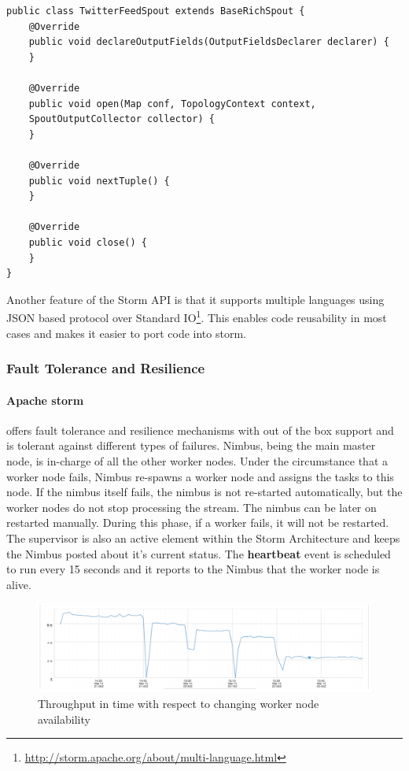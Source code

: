 \documentclass[runningheads,a4paper]{llncs}[2015/06/24]
\begin{document}
\begin{lstlisting}[float,caption=Bare Spout Implementation,label=lst:spout]
public class TwitterFeedSpout extends BaseRichSpout {
	@Override
	public void declareOutputFields(OutputFieldsDeclarer declarer) {
	}
	
	@Override
	public void open(Map conf, TopologyContext context, 
	SpoutOutputCollector collector) {
	}

	@Override
	public void nextTuple() {
	}

	@Override
	public void close() {
	}
}
\end{lstlisting}

Another feature of the Storm API is that it supports multiple languages using JSON based protocol over Standard IO\footnote{\url{http://storm.apache.org/about/multi-language.html}}. This enables code reusability in most cases and makes it easier to port code into storm. 

\subsubsection{Fault Tolerance and Resilience}
\label{sec:resilience}
\paragraph{Apache storm} offers fault tolerance and resilience mechanisms with out of the box support and is tolerant against different types of failures. Nimbus, being the main master node, is in-charge of all the other worker nodes. Under the circumstance that a worker node fails, Nimbus re-spawns a worker node and assigns the tasks to this node. If the nimbus itself fails, the nimbus is not re-started automatically, but the worker nodes do not stop processing the stream. The nimbus can be later on restarted manually. During this phase, if a worker fails, it will not be restarted. The supervisor is also an active element within the Storm Architecture and keeps the Nimbus posted about it's current status. The \textbf{heartbeat} event is scheduled to run every 15 seconds and it reports to the Nimbus that the worker node is alive. \cite{stormtwitter}

\begin{figure}
  \begin{center}
    \includegraphics[width=\textwidth, height=0.25\textheight]{throughput.png}
    \caption{Throughput in time with respect to changing worker node availability \cite{stormtwitter}}
    \label{fig:throughput}
   \end{center}
\end{figure}
\end{document}
